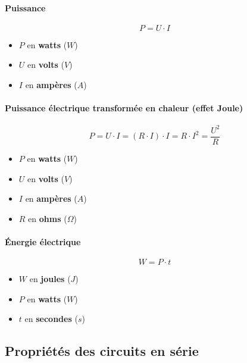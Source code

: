 \documentclass[]{article}
\let\oldparagraph\paragraph
\renewcommand{\paragraph}[1]{\oldparagraph{#1}\mbox{}}
\begin{document}
\paragraph{Puissance}\label{puissance}

{\large $$ P = U \cdot I $$ }

\begin{itemize}
	\item 
		$ P $ en \textbf{watts} ($W$)
	\item
		$ U $ en \textbf{volts} ($V$)
	\item
		$ I $ en \textbf{ampères} ($A$)
\end{itemize}



\paragraph{Puissance électrique transformée en chaleur (effet Joule)}\label{puissance-chaleur}

{\large $$ P = U \cdot I = (R \cdot I) \cdot I = R \cdot I^2 = \dfrac{U^2}{R}$$ }

\begin{itemize}
	\item 
		$ P $ en \textbf{watts} ($W$)
	\item
		$ U $ en \textbf{volts} ($V$)
	\item
		$ I $ en \textbf{ampères} ($A$)
	\item 
		$ R $ en \textbf{ohms} ($\Omega$)
\end{itemize}



\paragraph{Énergie électrique}\label{energie-electrique}

{\large $$ W = P \cdot t $$ }

\begin{itemize}
	\item 
		$ W $ en \textbf{joules} ($J$)
	\item
		$ P $ en \textbf{watts} ($W$)
	\item
		$ t $ en \textbf{secondes} ($s$)
\end{itemize}



\subsection{Propriétés des circuits en série}\label{propriete-circuit-serie}
\end{document}
